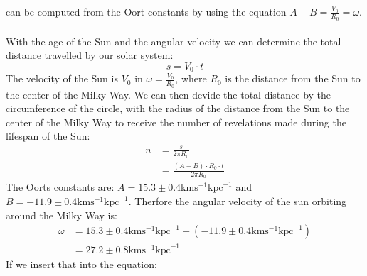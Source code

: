 can be computed from the Oort constants by using the equation $A - B = \frac{V_0}{R_0} = \omega$.\\
\\
With the age of the Sun and the angular velocity we can determine the total distance travelled by our
solar system:
\begin{equation*}
  s = V_0 \cdot t
\end{equation*}
The velocity of the Sun is $V_0$ in $\omega = \frac{V_0}{R_0}$, where $R_0$ is the distance from the Sun
to the center of the Milky Way. We can then devide the total distance by the circumference of the circle, 
with the radius of the distance from the Sun to the center of the Milky Way to receive the number of 
revelations made during the lifespan of the Sun:
\begin{equation*}
  \begin{split}
    n &= \frac{s}{2 \pi R_0}\\
      &= \frac{(A - B) \cdot R_0 \cdot t}{2 \pi R_0}
  \end{split}
\end{equation*}
The Oorts constants are: $A = 15.3 \pm 0.4 \text{km} \text{s}^{-1} \text{kpc}^{-1}$ and 
$B = -11.9 \pm 0.4 \text{km} \text{s}^{-1} \text{kpc}^{-1}$. Therfore the angular velocity of the sun
orbiting around the Milky Way is:
\begin{equation*}
  \begin{split}
    \omega &= 15.3 \pm 0.4 \text{km} \text{s}^{-1} \text{kpc}^{-1} - (-11.9 \pm 0.4 \text{km} \text{s}^{-1} \text{kpc}^{-1})\\
    &= 27.2 \pm 0.8 \text{km} \text{s}^{-1} \text{kpc}^{-1}
  \end{split}
\end{equation*}
If we insert that into the equation:
